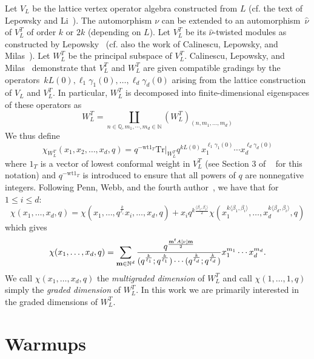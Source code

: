\documentclass[ALCO,Unicode,published]{cedram}
\begin{document}
Let $V_L$ be the lattice vertex operator algebra constructed from $L$ (cf. the text of Lepowsky and Li~\cite{LL}). The automorphism $\nu$ can be extended to an automorphism~$\hat{\nu}$ of $V_L^T$ of order $k$ or $2k$ (depending on $L$). Let $V_L^T$ be its $\hat{\nu}$-twisted modules as constructed by Lepowsky~\cite{L} (cf. also the work of Calinescu, Lepowsky, and Milas~\cite{CalLM4}). Let $W_L^T$ be the principal subspace of $V_L^T$. Calinescu, Lepowsky, and Milas~\cite{CalLM4} demonstrate that $V_L^T$ and $W_L^T$ are given compatible gradings by the operators~$kL(0), \ell_1 \gamma_1(0),\dots, \ell_d \gamma_d(0)$ arising from the lattice construction of $V_L$ and $V_L^T$. In particular, $W_L^T$ is decomposed into finite-dimensional eigenspaces of these operators as
\begin{equation}
W_L^T = \coprod_{n\in \mathbb{Q}, m_1,\cdots,m_d \in \mathbb{N}} \left(W_L^T\right)_{(n,m_1,\dots,m_d)}
\end{equation} 
We thus define
$$\chi_{W_L^T}(x_1,x_2,\dots,x_d,q) =  q^{-\text{wt}1_T} \mathrm{Tr}\vert_{W_L^T} q^{kL(0)} x_1^{\ell_1\gamma_1(0)}\cdots x_d^{\ell_d\gamma_d(0)} $$
where $1_T$ is a vector of lowest conformal weight in $V_L^T$ (see Section 3 of ~\cite{PSW} for this notation) and $ q^{-\text{wt}1_T} $ is introduced to ensure that all powers of $q$ are nonnegative integers.
Following Penn, Webb, and the fourth author~\cite{PS1,PS2,PSW}, 
we have that for~$1 \le i \le d$:
\begin{equation}\label{general-recursion}
\chi(x_1,\dots,x_d,q) = \chi(x_1,\dots,	q^{\frac{k}{\ell_i}}x_i,\dots,x_d,q) + x_iq^{k\frac{\langle \beta_i,\beta_i\rangle}{2}}\chi(x_1^{k\langle \beta_1,\beta_i\rangle},\dots,x_d^{k\langle \beta_d, \beta_i\rangle},q)
\end{equation}
which gives
\begin{equation}
\chi(x_1,\dots,x_d,q) = \sum_{{\bf m} \in \mathbb{N}^d} \frac{q^{\frac{{\bf m}^t A[\nu] {\bf m}}{2}}}{(q^{\frac{k}{\ell_1}};q^{{\frac{k}{\ell_1}}})\cdots (q^{\frac{k}{\ell_d}};q^{{\frac{k}{\ell_d}}})}x_1^{m_1}\cdots x_d^{m_d}.
\end{equation}
We call $\chi(x_1,\dots,x_d,q)$ the {\em multigraded dimension} of $W_L^T$ and call $\chi(1,\dots,1,q)$ simply the {\em graded dimension} of $W_L^T$. In this work we are primarily interested in the graded dimensions of $W_L^T$.

\section{Warmups}
\end{document}
